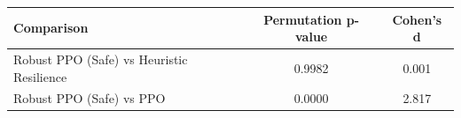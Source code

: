 \begin{tabular}{lcc}
\toprule
Comparison & Permutation p-value & Cohen's d \\
\midrule
Robust PPO (Safe) vs Heuristic Resilience & 0.9982 & 0.001 \\
Robust PPO (Safe) vs PPO & 0.0000 & 2.817 \\
\bottomrule
\end{tabular}
